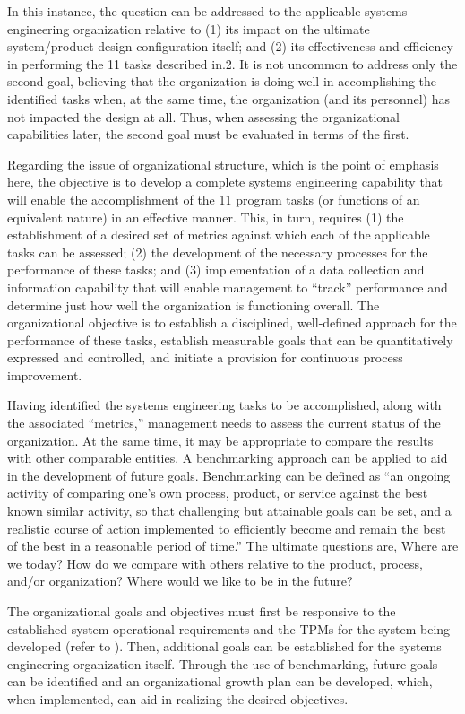 In this instance, the question can be addressed to the applicable systems engineering organization relative to (1) its impact on the ultimate system/product design configuration itself; and (2) its effectiveness and efficiency in performing the 11 tasks described in.2. It is not uncommon to address only the second goal, believing that the organization is doing well in accomplishing the identified tasks when, at the same time, the organization (and its personnel) has not impacted the design at all. Thus, when assessing the organizational capabilities later, the second goal must be evaluated in terms of the first.

Regarding the issue of organizational structure, which is the point of emphasis here, the objective is to develop a complete systems engineering capability that will enable the accomplishment of the 11 program tasks (or functions of an equivalent nature) in an effective manner. This, in turn, requires (1) the establishment of a desired set of metrics against which each of the applicable tasks can be assessed; (2) the development of the necessary processes for the performance of these tasks; and (3) implementation of a data collection and information capability that will enable management to “track” performance and determine just how well the organization is functioning overall. The organizational objective is to establish a disciplined, well-defined approach for the performance of these tasks, establish measurable goals that can be quantitatively expressed and controlled, and initiate a provision for continuous process improvement.

Having identified the systems engineering tasks to be accomplished, along with the associated ``metrics,'' management needs to assess the current status of the organization. At the same time, it may be appropriate to compare the results with other comparable entities. A benchmarking approach can be applied to aid in the development of future goals. Benchmarking can be defined as ``an ongoing activity of comparing one’s own process, product, or service against the best known similar activity, so that challenging but attainable goals can be set, and a realistic course of action implemented to efficiently become and remain the best of the best in a reasonable period of time.'' The ultimate questions are, Where are we today? How do we compare with others relative to the product, process, and/or organization? Where would we like to be in the future?

The organizational goals and objectives must first be responsive to the established system operational requirements and the TPMs for the system being developed (refer to ). Then, additional goals can be established for the systems engineering organization itself. Through the use of benchmarking, future goals can be identified and an organizational growth plan can be developed, which, when implemented, can aid in realizing the desired objectives.

